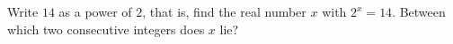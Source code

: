 Write $14$ as a power of $2$, that is, find the real number $x$ with $2^x=14$. Between which two consecutive integers does $x$ lie?
